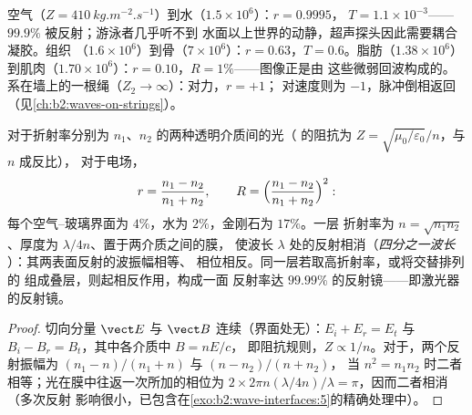 \begin{example}[三个界面处的声波]\label{ex:b2:wave-interfaces:sound}
空气（$Z = \qty{410}{kg.m^{-2}.s^{-1}}$）到水（$1.5 \times 10^6$）：$r = 0.9995$，
$T = 1.1 \times 10^{-3}$——$99.9\%$ 被反射；游泳者几乎听不到
水面以上世界的动静，超声探头因此需要耦合凝胶。组织
（$1.6 \times 10^6$）到骨（$7 \times 10^6$）：$r = 0.63$，$T = 0.6$。脂肪（$1.38 \times
10^6$）到肌肉（$1.70 \times 10^6$）：$r = 0.10$，$R = 1\%$——图像正是由
这些微弱回波构成的。系在墙上的一根绳（$Z_2 \to \infty$）：对力，$r = +1$；
对速度则为 $-1$，脉冲倒相返回
（见\cref{ch:b2:waves-on-strings}）。
\end{example}

\begin{proposition}\label{prop:b2:wave-interfaces:optics}
对于折射率分别为 $n_1$、$n_2$ 的两种透明介质间的光（
的阻抗为 $Z = \sqrt{\mu_0/\varepsilon_0}/n$，与 $n$ 成反比），
对于电场，
\[
r = \frac{n_1 - n_2}{n_1 + n_2} , \qquad R = \Bigl(\frac{n_1 - n_2}{n_1 + n_2}\Bigr)^2 :
\]
每个空气–玻璃界面为 $4\%$，水为 $2\%$，金刚石为 $17\%$。一层
折射率为 $n = \sqrt{n_1n_2}$、厚度为 $\lambda/4n$、置于两介质之间的膜，
使波长 $\lambda$ 处的反射相消（\emph{四分之一波长
}）：其两表面反射的波振幅相等、
相位相反。同一层若取高折射率，或将交替排列的
组成叠层，则起相反作用，构成一面
反射率达 $99.99\%$ 的反射镜——即激光器的反射镜。
\end{proposition}

\begin{proof}
切向分量 $\vect E$ 与 $\vect B$ 连续（界面处无）：$E_i + E_r = E_t$ 与 $B_i - B_r = B_t$，其中各介质中 $B = nE/c$，
即阻抗规则，$Z \propto 1/n$。对于，两个反射振幅为
$(n_1 - n)/(n_1 + n)$ 与 $(n - n_2)/(n + n_2)$，
当 $n^2 = n_1n_2$ 时二者相等；光在膜中往返一次所加的相位为
$2\times2\pi n(\lambda/4n)/\lambda = \pi$，因而二者相消（多次反射
影响很小，已包含在\cref{exo:b2:wave-interfaces:5}的精确处理中）。
\end{proof}

